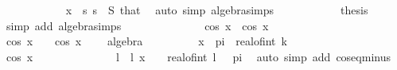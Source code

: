 \begin{isabellebody}
\ \ \ \ \ \ \ \ \ \ \isamarkupfalse%
\ {\isacartoucheopen}x\ {\isasymle}\ s{\isacartoucheclose}\ {\isacartoucheopen}s\ {\isasymin}\ {\isacharquery}{\kern0pt}S{\isacartoucheclose}\ that\ \isamarkupfalse%
\ {\isacharparenleft}{\kern0pt}auto\ simp{\isacharcolon}{\kern0pt}\ algebra{\isacharunderscore}{\kern0pt}simps{\isacharparenright}{\kern0pt}\isanewline
\ \ \ \ \ \ \ \ \isamarkupfalse%
\ \isamarkupfalse%
\ {\isacharquery}{\kern0pt}thesis\ \isamarkupfalse%
\ {\isacharparenleft}{\kern0pt}simp\ add{\isacharcolon}{\kern0pt}\ algebra{\isacharunderscore}{\kern0pt}simps{\isacharparenright}{\kern0pt}\isanewline
\ \ \ \ \ \ \isamarkupfalse%
\isanewline
\ \ \ \ \ \ \isamarkupfalse%
\ {\isachardoublequoteopen}cos\ x\ {\isacharasterisk}{\kern0pt}\ cos\ x\ {\isacharequal}{\kern0pt}\ {}{\isachardoublequoteclose}\isanewline
\ \ \ \ \ \ \isamarkupfalse%
\ {\isachardoublequoteopen}cos\ x\ {\isacharequal}{\kern0pt}\ {}\ {\isacharbar}{\kern0pt}\ cos\ x\ {\isacharequal}{\kern0pt}\ {\isacharminus}{\kern0pt}{}{\isachardoublequoteclose}\ \isamarkupfalse%
\ algebra\isanewline
\ \ \ \ \ \ \isamarkupfalse%
\ \isamarkupfalse%
\ {\isachardoublequoteopen}x\ {\isacharequal}{\kern0pt}\ pi\ {\isacharasterisk}{\kern0pt}\ real{\isacharunderscore}{\kern0pt}of{\isacharunderscore}{\kern0pt}int\ k{\isachardoublequoteclose}\isanewline
\ \ \ \ \ \ \isamarkupfalse%
\isanewline
\ \ \ \ \ \ \ \ \isamarkupfalse%
\ {\isachardoublequoteopen}cos\ x\ {\isacharequal}{\kern0pt}\ {\isacharminus}{\kern0pt}\ {}{\isachardoublequoteclose}\isanewline
\ \ \ \ \ \ \ \ \isamarkupfalse%
\ \isamarkupfalse%
\ l\ \ l{\isacharcolon}{\kern0pt}\ {\isachardoublequoteopen}x\ {\isacharequal}{\kern0pt}\ {\isacharparenleft}{\kern0pt}{}\ {\isacharasterisk}{\kern0pt}\ real{\isacharunderscore}{\kern0pt}of{\isacharunderscore}{\kern0pt}int\ l\ {\isacharplus}{\kern0pt}\ {}{\isacharparenright}{\kern0pt}\ {\isacharasterisk}{\kern0pt}pi{\isachardoublequoteclose}\ \isamarkupfalse%
\ {\isacharparenleft}{\kern0pt}auto\ simp\ add{\isacharcolon}{\kern0pt}\ cos{\isacharunderscore}{\kern0pt}eq{\isacharunderscore}{\kern0pt}minus{}{\isacharparenright}{\kern0pt}\isanewline
\ \ \ \ \ \ \ \ \isamarkupfalse%

\end{isabellebody}
